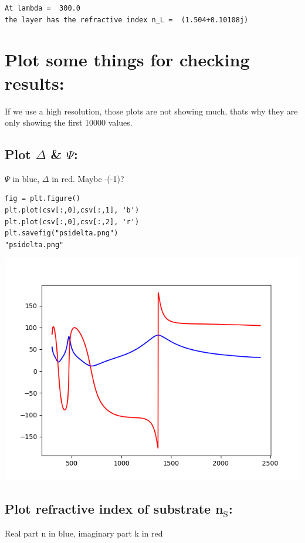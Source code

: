 \documentclass[11pt]{article}
\begin{document}
\begin{verbatim}
At lambda =  300.0
the layer has the refractive index n_L =  (1.504+0.10108j)
\end{verbatim}

\section{Plot some things for checking results:}
\label{sec:orgcc8096c}

If we use a high resolution, those plots are not showing much, thats why they are only showing the first 10000 values.
\subsection{Plot \(\Delta\) \& \(\Psi\):}
\label{sec:org65e6ce4}

\(\Psi\) in blue, \(\Delta\) in red. Maybe \(\cdot\)(-1)?
\begin{verbatim}
fig = plt.figure()
plt.plot(csv[:,0],csv[:,1], 'b')
plt.plot(csv[:,0],csv[:,2], 'r') 
plt.savefig("psidelta.png")
"psidelta.png"
\end{verbatim}

\begin{center}
\includegraphics[width=.9\linewidth]{psidelta.png}
\end{center}

\subsection{Plot refractive index of substrate n\(_{\text{S}}\):}
\label{sec:org6110580}

Real part n in blue, imaginary part k in red
\end{document}
